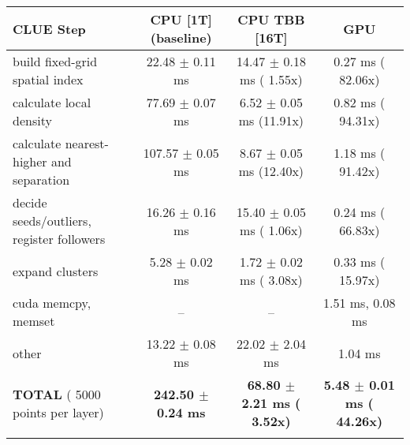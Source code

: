     \begin{tabular}{l|c|c|c}
    \hline
    CLUE Step                                 & CPU [1T] (baseline)         & CPU TBB [16T]                         & GPU                       \\ \hline
    build fixed-grid spatial index            &  22.48 $\pm$  0.11 ms       &  14.47 $\pm$  0.18 ms ( 1.55x)        &   0.27 ms ( 82.06x)       \\
    calculate local density                   &  77.69 $\pm$  0.07 ms       &   6.52 $\pm$  0.05 ms (11.91x)        &   0.82 ms ( 94.31x)       \\
    calculate nearest-higher and separation   & 107.57 $\pm$  0.05 ms       &   8.67 $\pm$  0.05 ms (12.40x)        &   1.18 ms ( 91.42x)       \\
    decide seeds/outliers, register followers &  16.26 $\pm$  0.16 ms       &  15.40 $\pm$  0.05 ms ( 1.06x)        &   0.24 ms ( 66.83x)       \\
    expand clusters                           &   5.28 $\pm$  0.02 ms       &   1.72 $\pm$  0.02 ms ( 3.08x)        &   0.33 ms ( 15.97x)       \\ \hline
    cuda memcpy, memset                       & --                          & --                                    &   1.51 ms,   0.08 ms      \\ 
    other                                     &  13.22 $\pm$  0.08 ms       &  22.02 $\pm$  2.04 ms                 &   1.04 ms                 \\ \hline
    \textbf{TOTAL} ( 5000 points per layer)   & \textbf{242.50 $\pm$  0.24 ms} & \textbf{ 68.80 $\pm$  2.21 ms ( 3.52x)} & \textbf{  5.48 $\pm$  0.01 ms ( 44.26x)}  \\
    \hline
    \multicolumn{4}{c}{} 
    \end{tabular}
    \linebreak


